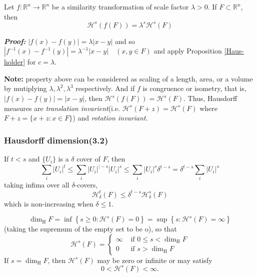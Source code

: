 \begin{property}
    Let $f: \mathbb{R}^{n} \rightarrow \mathbb{R}^{n}$ be a similarity transformation of scale factor $\lambda>0$. If $F \subset \mathbb{R}^{n}$, then
$$
\mathcal{H}^{s}(f(F))=\lambda^{s} \mathcal{H}^{s}(F)
$$
\end{property}

\textbf{\textit{Proof:}} $|f(x)-f(y)|=\lambda|x-y|$ and so $\left|f^{-1}(x)-f^{-1}(y)\right|=\lambda^{-1}|x-y| \quad(x, y \in F)$ and apply Proposition \ref{Haus-holder} for $c=\lambda$.

\textbf{Note: } property above can be considered as scaling of a length, area, or a volume by mutiplying $\lambda, \lambda^2, \lambda^3$ respectively. And if $f$ is congruence or isometry, that is, $|f(x)-f(y)| = |x-y|$, then $\mathcal{H}^s(f(F)) = \mathcal{H}^s(F)$. 
Thus, Hausdorff measures are \textit{translation invarient}(i.e. $\mathcal{H}^s(F+z) = \mathcal{H}^s(F)$ where $F+z = \{x+z:x\in F\}$) and \textit{rotation invariant}. 

\newpage
\subsubsection{Hausdorff dimension(3.2)}

\begin{property}
    If $t<s$ and $\{U_i\}$ is a $\delta$ cover of $F$, then
    $$
    \sum_{i}\left|U_{i}\right|^{t} \leq \sum_{i}\left|U_{i}\right|^{\mid-s}\left|U_{i}\right|^{s} \leq  \sum_{i}\left|U_{i}\right|^{s}\delta^{t-s} = \delta^{t-s} \sum_{i}\left|U_{i}\right|^{s}
    $$
    taking infima over all $\delta$-covers,
    $$
    \mathcal{H}^t_\delta(F)\leq \delta^{t-s}\mathcal{H}^s_\delta(F)
    $$
    which is non-increasing when $\delta\leq 1$.
\end{property}

\begin{definition}
    $$\operatorname{dim}_{\mathrm{H}} F=\inf \left\{s \geq 0: \mathcal{H}^{s}(F)=0\right\}=\sup \left\{s: \mathcal{H}^{s}(F)=\infty\right\}$$
(taking the supremum of the empty set to be o), so that
$$
\mathcal{H}^{s}(F)=\left\{\begin{array}{ll}
\infty & \text { if } 0 \leq s<\operatorname{dim}_{\mathrm{H}} F \\
0 & \text { if } s>\operatorname{dim}_{\mathrm{H}} F
\end{array}\right.
$$
If $s=\operatorname{dim}_{\mathrm{H}} F$, then $\mathcal{H}^{s}(F)$ may be zero or infinite or may satisfy
$$
0<\mathcal{H}^{s}(F)<\infty .
$$
\end{definition}

